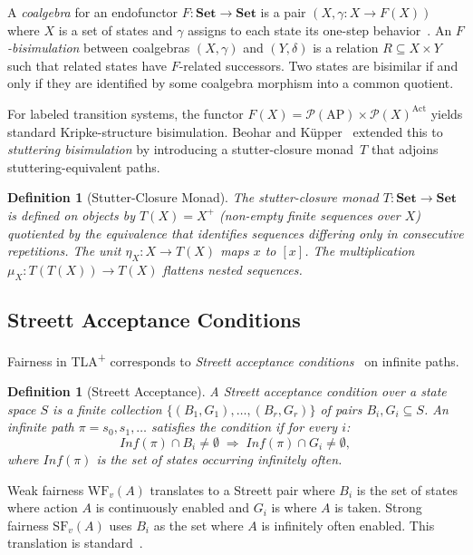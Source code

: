 \documentclass[11pt]{article}
\newtheorem{definition}[theorem]{Definition}
\newcommand{\Set}{\mathbf{Set}}
\newcommand{\Pow}{\mathcal{P}}
\newcommand{\Act}{\ensuremath{\mathrm{Act}}}
\newcommand{\AP}{\ensuremath{\mathrm{AP}}}
\newcommand{\WF}{\ensuremath{\mathrm{WF}}}
\newcommand{\SF}{\ensuremath{\mathrm{SF}}}
\newcommand{\TLAplus}{TLA\textsuperscript{+}}
\begin{document}
A \emph{coalgebra} for an endofunctor $F : \Set \to \Set$ is a pair
$(X, \gamma : X \to F(X))$ where $X$ is a set of states and $\gamma$
assigns to each state its one-step behavior~\cite{Rutten00}.
An \emph{$F$-bisimulation} between coalgebras $(X, \gamma)$ and
$(Y, \delta)$ is a relation $R \subseteq X \times Y$ such that related
states have $F$-related successors.
Two states are bisimilar if and only if they are identified by some
coalgebra morphism into a common quotient.

For labeled transition systems, the functor
$F(X) = \Pow(\AP) \times \Pow(X)^{\Act}$ yields standard Kripke-structure
bisimulation.
Beohar and K\"upper~\cite{BeoharK17} extended this to \emph{stuttering
bisimulation} by introducing a stutter-closure monad~$T$ that adjoins
stuttering-equivalent paths.

\begin{definition}[Stutter-Closure Monad]
\label{def:stutter-monad}
The stutter-closure monad $T : \Set \to \Set$ is defined on objects by
$T(X) = X^+$ (non-empty finite sequences over $X$) quotiented by the
equivalence that identifies sequences differing only in consecutive
repetitions.
The unit $\eta_X : X \to T(X)$ maps $x$ to $[x]$.
The multiplication $\mu_X : T(T(X)) \to T(X)$ flattens nested sequences.
\end{definition}

\subsection{Streett Acceptance Conditions}

Fairness in \TLAplus{} corresponds to \emph{Streett acceptance
conditions}~\cite{Streett82} on infinite paths.

\begin{definition}[Streett Acceptance]
\label{def:streett}
A \emph{Streett acceptance condition} over a state space $S$ is a finite
collection $\{(B_1, G_1), \ldots, (B_r, G_r)\}$ of pairs
$B_i, G_i \subseteq S$.
An infinite path $\pi = s_0, s_1, \ldots$ satisfies the condition if for
every $i$:
\[
  \mathit{Inf}(\pi) \cap B_i \neq \emptyset
  \;\Longrightarrow\;
  \mathit{Inf}(\pi) \cap G_i \neq \emptyset,
\]
where $\mathit{Inf}(\pi)$ is the set of states occurring infinitely often.
\end{definition}

Weak fairness $\WF_v(A)$ translates to a Streett pair where $B_i$ is the
set of states where action $A$ is continuously enabled and $G_i$ is where
$A$ is taken.
Strong fairness $\SF_v(A)$ uses $B_i$ as the set where $A$ is infinitely
often enabled.
This translation is standard~\cite{Lamport94,MannaP92}.
\end{document}
